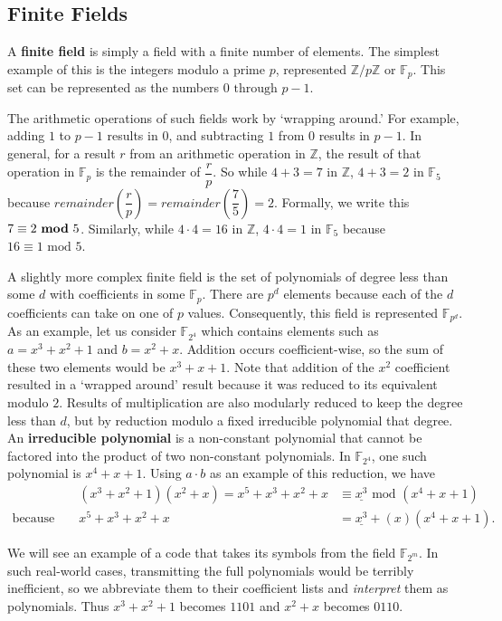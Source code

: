 \documentclass[11pt]{article}
\newcommand{\Z}{\mathbb{Z}}
\newcommand{\F}{\mathbb{F}}
\begin{document}
\subsection{Finite Fields}

A \textbf{finite field} is simply a field with a finite number of elements. The simplest example of this is the integers modulo a prime $p$, represented $\Z/p\Z$ or $\F_{p}$. This set can be represented as the numbers $0\text{ through }p-1$.

The arithmetic operations of such fields work by `wrapping around.' For example, adding $1$ to $p-1$ results in $0$, and subtracting $1$ from $0$ results in $p-1$. In general, for a result $r$ from an arithmetic operation in $\Z$, the result of that operation in $\F_{p}$ is the remainder of $\dfrac{r}{p}$. So while $4+3=7$ in $\Z$, $4+3=2$ in $\F_{5}$ because $remainder(\dfrac{r}{p})=remainder(\dfrac{7}{5})=2$. Formally, we write this $7\equiv2\text{ \textbf{mod} }5$. Similarly, while $4\cdot4=16$ in $\Z$, $4\cdot4=1$ in $\F_{5}$ because $16\equiv1\text{ mod }5$.

A slightly more complex finite field is the set of polynomials of degree less than some $d$ with coefficients in some $\F_{p}$. There are $p^{d}$ elements because each of the $d$ coefficients can take on one of $p$ values. Consequently, this field is represented $\F_{p^{d}}$. As an example, let us consider $\F_{2^{4}}$ which contains elements such as $a=x^{3}+x^{2}+1$ and $b=x^{2}+x$. Addition occurs coefficient-wise, so the sum of these two elements would be $x^{3}+x+1$. Note that addition of the $x^{2}$ coefficient resulted in a `wrapped around' result because it was reduced to its equivalent modulo $2$. Results of multiplication are also modularly reduced to keep the degree less than $d$, but by reduction modulo a fixed irreducible polynomial that degree. An \textbf{irreducible polynomial} is a non-constant polynomial that cannot be factored into the product of two non-constant polynomials. In $\F_{2^{4}}$, one such polynomial is $x^{4}+x+1$. Using $a\cdot b$ as an example of this reduction, we have
\begin{align*}
&&(x^{3}+x^{2}+1)(x^{2}+x)=x^{5}+x^{3}+x^{2}+x&\equiv\underline{x^{3}}\text{ mod }(x^{4}+x+1)\\
\text{because }&&x^{5}+x^{3}+x^{2}+x&=\underline{x^{3}}+(x)(x^{4}+x+1).
\end{align*}

We will see an example of a code that takes its symbols from the field $\F_{2^{m}}$. In such real-world cases, transmitting the full polynomials would be terribly inefficient, so we abbreviate them to their coefficient lists and \textit{interpret} them as polynomials. Thus $x^{3}+x^{2}+1$ becomes $1101$ and $x^{2}+x$ becomes $0110$.
\end{document}
